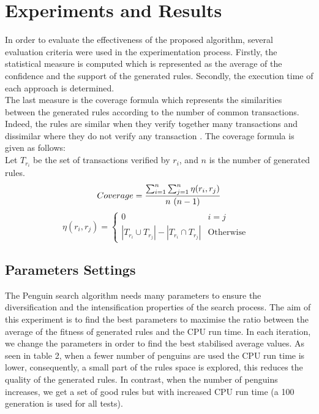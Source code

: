 \documentclass[preprint,12pt]{elsarticle}
\begin{document}
\section{Experiments and Results}
In order to evaluate the effectiveness of the proposed algorithm, several evaluation criteria were used in the experimentation process.
Firstly, the statistical measure is computed which is represented as the average of the confidence and the support of the generated rules. 
Secondly, the execution time of each approach is determined. \\
The last measure is the coverage formula which represents the similarities 
between the generated rules according to the number of common transactions. Indeed, 
the rules are similar when they verify together many transactions and dissimilar where
they do not verify any transaction \cite{27}. The coverage formula is given as follows:\\
Let $T_{r_i}$ be the set of transactions verified by $r_{i}$, and $n$ is the number of generated rules.\\
\begin{displaymath}
Coverage =   \frac{\sum_{i=1}^{n}{\sum_{j=1}^{n} {\eta{(r_{i},r_{j})}}}}{n~(n-1)} \\
\end{displaymath}
\begin{displaymath}
\eta{(r_{i},r_{j})} =
\left\lbrace
\begin{array}{ccc}
0          &  i = j & \\
\left|T_{r_{i}} \cup T_{r_{j}}\right| - \left|T_{r_{i}} \cap T_{r_{j}}\right|  & \mbox{Otherwise}  
\end{array}\right.
\end{displaymath}

\subsection{Parameters Settings}
The Penguin search algorithm needs many parameters to ensure the diversification and the intensification properties of the search
process. The aim of this experiment is to find the best parameters to maximise the ratio 
between the average of the fitness of generated rules and the CPU run time. 
In each iteration, we change the parameters in order to find the best stabilised average values. As seen in table 2, when a fewer number of penguins are used the CPU run time is lower, consequently, 
a small part of the rules space is explored, this reduces the quality of the generated rules. In contrast, when the number of penguins 
increases, we get a set of good rules but with increased CPU run time (a 100 generation is used for all tests).
\end{document}

